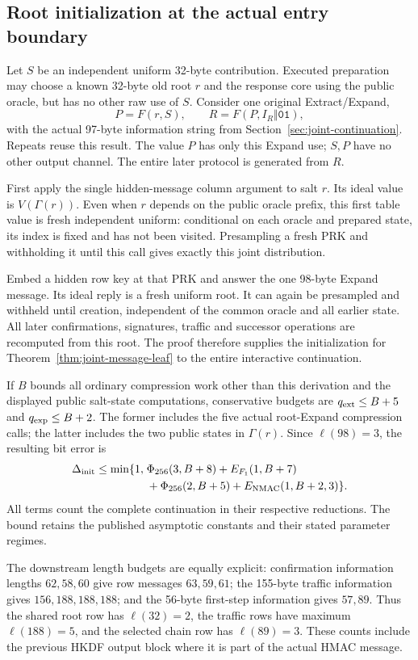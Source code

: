 \subsection{Root initialization at the actual entry boundary}
\label{app:joint-root-entry}

Let $S$ be an independent uniform 32-byte contribution. Executed
preparation may choose a known 32-byte old root $r$ and the response
core using the public oracle, but has no other raw use of $S$. Consider
one original Extract/Expand,
\[
 P=F(r,S),\qquad R=F(P,I_R\Vert\mathtt{01}),
\]
with the actual 97-byte information string from
Section~\ref{sec:joint-continuation}. Repeats reuse this result.
The value $P$ has only this Expand use; $S,P$ have no other output
channel. The entire later protocol is generated from $R$.

First apply the single hidden-message column argument to salt $r$.
Its ideal value is $V(\Gamma(r))$. Even when $r$ depends on the public
oracle prefix, this first table value is fresh independent uniform:
conditional on each oracle and prepared state, its index is fixed and
has not been visited. Presampling a fresh PRK and withholding it until
this call gives exactly this joint distribution.

Embed a hidden row key at that PRK and answer the one 98-byte Expand
message. Its ideal reply is a fresh uniform root. It can again be
presampled and withheld until creation, independent of the common
oracle and all earlier state. All later confirmations, signatures,
traffic and successor operations are recomputed from this root.
The proof therefore supplies the initialization for
Theorem~\ref{thm:joint-message-leaf} to the entire interactive
continuation.

If $B$ bounds all ordinary compression work other than this derivation
and the displayed public salt-state computations, conservative budgets
are $q_{\rm ext}\le B+5$ and $q_{\rm exp}\le B+2$.
The former includes the five actual root-Expand compression calls; the
latter includes the two public states in $\Gamma(r)$.
Since $\ell(98)=3$, the resulting bit error is
\begin{equation}
\begin{split}
 \Delta_{\rm init}\le\min\{1,\;&
 \Phi_{256}(3,B+8)+E_{F_1}(1,B+7)\\
 &+\Phi_{256}(2,B+5)+E_{\rm NMAC}(1,B+2,3)\}.
\end{split}
 \label{eq:appendix-root-initialization}
\end{equation}
All terms count the complete continuation in their respective reductions.
The bound retains the published asymptotic constants and their stated
parameter regimes.

The downstream length budgets are equally explicit: confirmation
information lengths $62,58,60$ give row messages $63,59,61$; the
155-byte traffic information gives $156,188,188,188$; and the
56-byte first-step information gives $57,89$. Thus the shared root row
has $\ell(32)=2$, the traffic rows have maximum $\ell(188)=5$, and the
selected chain row has $\ell(89)=3$. These counts include the previous
HKDF output block where it is part of the actual HMAC message.
